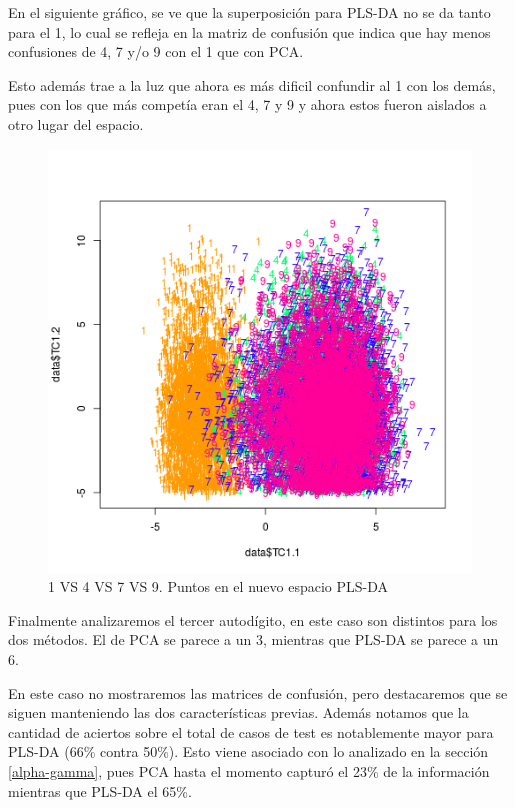 En el siguiente gr\'afico, se ve que la superposici\'on para PLS-DA no se da tanto para el 1, lo cual se refleja en la matriz de confusi\'on que indica que hay menos confusiones de 4, 7 y/o 9 con el 1 que con PCA.

Esto adem\'as trae a la luz que ahora es m\'as dificil confundir al 1 con los dem\'as, pues con los que m\'as compet\'ia eran el 4, 7 y 9 y ahora estos fueron aislados a otro lugar del espacio.

\newpage

\begin{figure}[h!]
  \begin{center}
	\includegraphics[scale=0.8]{exp5/PLS-2-1vs4vs7vs9}
	\caption{1 VS 4 VS 7 VS 9. Puntos en el nuevo espacio PLS-DA}
  \end{center}
\end{figure}

Finalmente analizaremos el tercer autod\'igito, en este caso son distintos para los dos m\'etodos. El de PCA se parece a un 3, mientras que PLS-DA se parece a un 6.

En este caso no mostraremos las matrices de confusi\'on, pero destacaremos que se siguen manteniendo las dos caracter\'isticas previas. Adem\'as notamos que la cantidad de aciertos sobre el total de casos de test es notablemente mayor para PLS-DA (66\% contra 50\%). Esto viene asociado con lo analizado en la secci\'on \ref{alpha-gamma}, pues PCA hasta el momento captur\'o el 23\% de la informaci\'on mientras que PLS-DA el 65\%.

